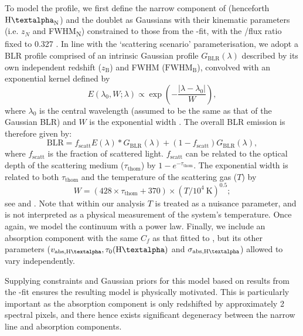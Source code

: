 \documentclass[fleqn,usenatbib]{mnras}
\newcommand{\Halpha}{\text{H\textalpha}\xspace}
\newcommand{\Hbeta}{\text{H\textbeta}\xspace}
\newcommand{\NIIall}{\forbiddenEL[N][ii][\textlambda][\textlambda][6548,][6583]}
\begin{document}
To model the \Halpha profile, we first define the narrow component of \Halpha (henceforth $\Halpha_\mathrm{N}$) and the \NIIall doublet as Gaussians with their kinematic parameters (i.e. $z_N$ and FWHM\textsubscript{N}) constrained to those from the \Hbeta-\OIIIL fit, with the \NIIL[6548]/\NIIL[6583] flux ratio fixed to 0.327 \citep[see][]{Dojcinovic2023}. In line with the `scattering scenario' parameterisation, we adopt a BLR profile comprised of an intrinsic Gaussian profile $G_\mathrm{BLR}(\lambda)$ described by its own independent redshift ($z_\mathrm{B}$) and FWHM ($\mathrm{FWHM}_\mathrm{B}$), convolved with an exponential kernel defined by
\begin{equation}
E(\lambda_0, W;\lambda) \propto \exp\left({-\frac{|\lambda-\lambda_0|}{W}}\right),
\label{eq:E}
\end{equation}
where $\lambda_0$ is the central wavelength (assumed to be the same as that of the Gaussian BLR) and $W$ is the exponential width \citep{Laor2006}. The overall BLR emission is therefore given by:
\begin{equation}
    \mathrm{BLR} = f_\mathrm{scatt}E(\lambda)\ast G_\mathrm{BLR}(\lambda)+(1-f_\mathrm{scatt})G_\mathrm{BLR}(\lambda),
    \label{eq:BLR}
\end{equation}
where $f_\mathrm{scatt}$ is the fraction of scattered light. $f_\mathrm{scatt}$ can be related to the optical depth of the scattering medium ($\tau_\mathrm{thom}$) by $1-e^{-\tau_\mathrm{thom}}$. The exponential width is related to both $\tau_\mathrm{thom}$ and the temperature of the scattering gas ($T$) by
\begin{equation}
    W = (428\times\tau_\mathrm{thom} + 370)\times(T/10^4 \ \mathrm{K})^{0.5};
    \label{eq:W}
\end{equation}
see \cite{Laor2006} and \cite{Rusakov2026}. Note that within our analysis $T$ is treated as a nuisance parameter, and is not interpreted as a physical measurement of the system's temperature.
Once again, we model the continuum with a power law.
Finally, we include an absorption component with the same $C_f$ as that fitted to \Hbeta, but its other parameters ($v_\mathrm{abs, \Halpha}, \tau_0(\Halpha)$ and $\sigma_\mathrm{abs, \Halpha}$) allowed to vary independently.

Supplying constraints and Gaussian priors for this model based on results from the \Hbeta-\OIIIL fit ensures the resulting \Halpha model is physically motivated.
This is particularly important as the absorption component is only redshifted by approximately 2 spectral pixels, and there hence exists significant degeneracy between the narrow line and absorption components.
\end{document}
